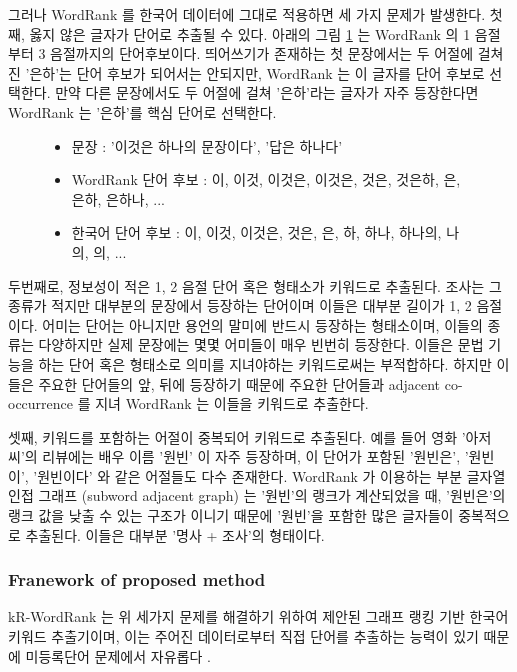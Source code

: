 \documentclass[11pt]{article}
\begin{document}
그러나 WordRank 를 한국어 데이터에 그대로 적용하면 세 가지 문제가 발생한다.
첫째, 옳지 않은 글자가 단어로 추출될 수 있다.
아래의 그림 \ref{fig:krwordrank_candidates} 는 WordRank 의 1 음절부터 3 음절까지의 단어후보이다.
띄어쓰기가 존재하는 첫 문장에서는 두 어절에 걸쳐진 '은하'는 단어 후보가 되어서는 안되지만, WordRank 는 이 글자를 단어 후보로 선택한다.
만약 다른 문장에서도 두 어절에 걸쳐 '은하'라는 글자가 자주 등장한다면 WordRank 는 '은하'를 핵심 단어로 선택한다.

\begin{figure}
\label{fig:krwordrank_candidates}
\begin{itemize}
  \item 문장 : '이것은 하나의 문장이다', '답은 하나다'
  \item WordRank 단어 후보 : 이, 이것, 이것은, 이것은, 것은, 것은하, 은, 은하, 은하나, ...
  \item 한국어 단어 후보 : 이, 이것, 이것은, 것은, 은, 하, 하나, 하나의, 나의, 의, ...
\end{itemize}
\end{figure}

두번째로, 정보성이 적은 1, 2 음절 단어 혹은 형태소가 키워드로 추출된다.
조사는 그 종류가 적지만 대부분의 문장에서 등장하는 단어이며 이들은 대부분 길이가 1, 2 음절이다.
어미는 단어는 아니지만 용언의 말미에 반드시 등장하는 형태소이며, 이들의 종류는 다양하지만 실제 문장에는 몇몇 어미들이 매우 빈번히 등장한다.
이들은 문법 기능을 하는 단어 혹은 형태소로 의미를 지녀야하는 키워드로써는 부적합하다.
하지만 이들은 주요한 단어들의 앞, 뒤에 등장하기 때문에 주요한 단어들과 adjacent co-occurrence 를 지녀 WordRank 는 이들을 키워드로 추출한다.

셋째, 키워드를 포함하는 어절이 중복되어 키워드로 추출된다.
예를 들어 영화 '아저씨'의 리뷰에는 배우 이름 '원빈' 이 자주 등장하며, 이 단어가 포함된 '원빈은', '원빈이', '원빈이다' 와 같은 어절들도 다수 존재한다.
WordRank 가 이용하는 부분 글자열 인접 그래프 (subword adjacent graph) 는 '원빈'의 랭크가 계산되었을 때, '원빈은'의 랭크 값을 낮출 수 있는 구조가 이니기 때문에 '원빈'을 포함한 많은 글자들이 중복적으로 추출된다.
이들은 대부분 '명사 + 조사'의 형태이다.

\subsubsection{Franework of proposed method}

kR-WordRank 는 위 세가지 문제를 해결하기 위하여 제안된 그래프 랭킹 기반 한국어 키워드 추출기이며, 이는 주어진 데이터로부터 직접 단어를 추출하는 능력이 있기 때문에 미등록단어 문제에서 자유롭다 \citep{kim2014kr}.
\end{document}
